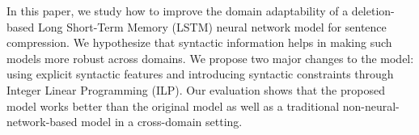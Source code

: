 In this paper, we study how to improve the domain adaptability of a deletion-based Long Short-Term Memory (LSTM) neural network model for sentence compression. We hypothesize that syntactic information helps in making such models more robust across domains. We propose two major changes to the model: using explicit syntactic features and introducing syntactic constraints through Integer Linear Programming (ILP). Our evaluation shows that the proposed model works better than the original model as well as a traditional non-neural-network-based model in a cross-domain setting.
